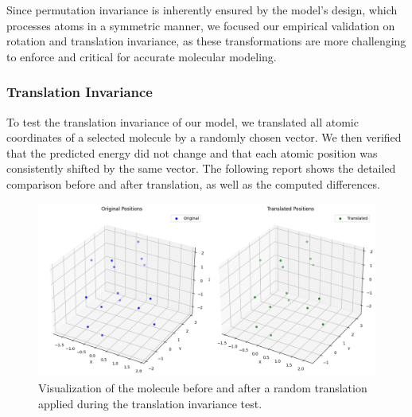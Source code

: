 \documentclass{article}
\begin{document}
Since permutation invariance is inherently ensured by the model's design, which processes atoms in a symmetric manner, we focused our empirical validation on rotation and translation invariance, as these transformations are more challenging to enforce and critical for accurate molecular modeling.


\subsubsection{Translation Invariance}

To test the translation invariance of our model, we translated all atomic coordinates of a selected molecule by a randomly chosen vector. We then verified that the predicted energy did not change and that each atomic position was consistently shifted by the same vector. The following report shows the detailed comparison before and after translation, as well as the computed differences.
\begin{figure}[H]
  \centering
  \includegraphics[width=0.85\linewidth]{Images_Ayoub/Invariance/Scattering/Translation.png}
  \caption{Visualization of the molecule before and after a random translation applied during the translation invariance test.}
  \label{fig:translation_invariance_visualization}
\end{figure}
\end{document}
